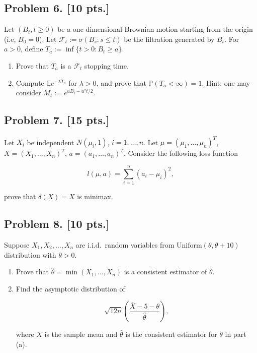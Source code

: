 \documentclass[11pt,a4paper]{article}
\begin{document}
\subsection{Problem 6. [10 pts.]}
Let \( (B_t, t \ge 0) \) be a one-dimensional Brownian motion starting from the origin (i.e, \( B_0 = 0 \)). Let \( \mathcal{F}_t := \sigma(B_s : s \le t) \) be the filtration generated by \( B_t \). For \( a > 0 \), define \( T_a := \inf\{t > 0 : B_t \ge a\} \).
\begin{enumerate}[label=(\alph*)]
    \item Prove that \( T_a \) is a \( \mathcal{F}_t \) stopping time.
    \item Compute \( \mathbb{E} e^{-\lambda T_a} \) for \( \lambda > 0 \), and prove that \( \mathbb{P}(T_a < \infty) = 1 \). Hint: one may consider \( M_t := e^{u B_t - u^2 t/2} \).
\end{enumerate}

\subsection{Problem 7. [15 pts.]}
Let \( X_i \) be independent \( N(\mu_i, 1) \), \( i = 1, \dots, n \). Let \( \mu = (\mu_1, \dots, \mu_n)^T \), \( X = (X_1, \dots, X_n)^T \), \( a = (a_1, \dots, a_n)^T \). Consider the following loss function

\[
l(\mu, a) = \sum_{i=1}^n (a_i - \mu_i)^2,
\]

prove that \( \delta(X) = X \) is minimax.

\subsection{Problem 8. [10 pts.]}
Suppose \( X_1, X_2, \dots, X_n \) are i.i.d.\ random variables from \( \mathrm{Uniform}(\theta, \theta + 10) \) distribution with \( \theta > 0 \).
\begin{enumerate}[label=(\alph*)]
    \item Prove that \( \hat{\theta} = \min(X_1, \dots, X_n) \) is a consistent estimator of \( \theta \).
    \item Find the asymptotic distribution of

    \[
    \sqrt{12n} \left( \frac{\overline{X} - 5 - \theta}{\hat{\theta}} \right),
    \]

    where \( \overline{X} \) is the sample mean and \( \hat{\theta} \) is the consistent estimator for \( \theta \) in part (a).
\end{enumerate}
\end{document}
